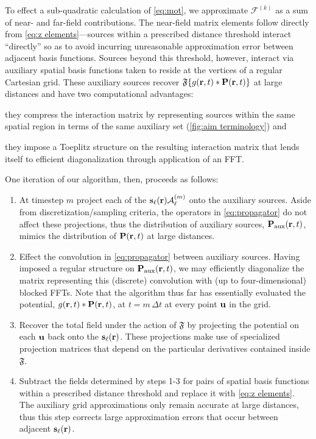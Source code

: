 To effect a sub-quadratic calculation of \cref{eq:mot}, we approximate $\mathcal{F}^{(k)}$ as a sum of near- and far-field contributions.
The near-field matrix elements follow directly from \cref{eq:z elements}---sources within a prescribed distance threshold interact ``directly'' so as to avoid incurring unreasonable approximation error between adjacent basis functions.
Sources beyond this threshold, however, interact via auxiliary spatial basis functions taken to reside at the vertices of a regular Cartesian grid.
These auxiliary sources recover $\mathfrak{F}\qty{g(\vb{r}, t) \ast \vb{P}(\vb{r}, t)}$ at large distances and have two computational advantages:
\begin{inparaenum}[(i)]
  \item they compress the interaction matrix by representing sources within the same spatial region in terms of the same auxiliary set (\cref{fig:aim terminology}) and
  \item they impose a Toeplitz structure on the resulting interaction matrix that lends itself to efficient diagonalization through application of an FFT.
\end{inparaenum}
One iteration of our algorithm, then, proceeds as follows:
\begin{enumerate}
  \item At timestep $m$ project each of the $\vb{s}_\ell(\vb{r}) \mathcal{A}^\qty(m)_\ell$ onto the auxiliary sources.
    Aside from discretization/sampling criteria, the operators in \cref{eq:propagator} do not affect these projections, thus the distribution of auxiliary sources, $\vb{P}_\text{aux}(\vb{r}, t)$, mimics the distribution of $\vb{P}(\vb{r}, t)$ at large distances.
  \item Effect the convolution in \cref{eq:propagator} between auxiliary sources.
    Having imposed a regular structure on $\vb{P}_\text{aux}(\vb{r}, t)$, we may efficiently diagonalize the matrix representing this (discrete) convolution with (up to four-dimensional) blocked FFTs.
    Note that the algorithm thus far has essentially evaluated the potential, $g(\vb{r}, t) \ast \vb{P}(\vb{r}, t)$, at $t = m \, \Delta t$ at every point $\vb{u}$ in the grid.
  \item Recover the total field under the action of $\mathfrak{F}$ by projecting the potential on each $\vb{u}$ back onto the $\vb{s}_\ell(\vb{r})$.
    These projections make use of specialized projection matrices that depend on the particular derivatives contained inside $\mathfrak{F}$.
  \item Subtract the fields determined by steps 1-3 for pairs of spatial basis functions within a prescribed distance threshold and replace it with \cref{eq:z elements}.
    The auxiliary grid approximations only remain accurate at large distances, thus this step corrects large approximation errors that occur between adjacent $\vb{s}_\ell(\vb{r})$.
\end{enumerate}
